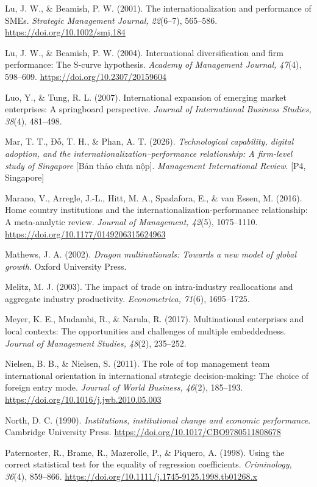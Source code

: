 \documentclass[
  a4paper,
  13pt]{extreport}
\begin{document}
Lu, J. W., \& Beamish, P. W. (2001). The internationalization and
performance of SMEs. \emph{Strategic Management Journal, 22}(6--7),
565--586. \url{https://doi.org/10.1002/smj.184}

Lu, J. W., \& Beamish, P. W. (2004). International diversification and
firm performance: The S-curve hypothesis. \emph{Academy of Management
Journal, 47}(4), 598--609. \url{https://doi.org/10.2307/20159604}

Luo, Y., \& Tung, R. L. (2007). International expansion of emerging
market enterprises: A springboard perspective. \emph{Journal of
International Business Studies, 38}(4), 481--498.

Mar, T. T., Đỗ, T. H., \& Phan, A. T. (2026). \emph{Technological
capability, digital adoption, and the internationalization--performance
relationship: A firm-level study of Singapore} {[}Bản thảo chưa nộp{]}.
\emph{Management International Review}. {[}P4, Singapore{]}

Marano, V., Arregle, J.-L., Hitt, M. A., Spadafora, E., \& van Essen, M.
(2016). Home country institutions and the
internationalization-performance relationship: A meta-analytic review.
\emph{Journal of Management, 42}(5), 1075--1110.
\url{https://doi.org/10.1177/0149206315624963}

Mathews, J. A. (2002). \emph{Dragon multinationals: Towards a new model
of global growth}. Oxford University Press.

Melitz, M. J. (2003). The impact of trade on intra-industry
reallocations and aggregate industry productivity. \emph{Econometrica,
71}(6), 1695--1725.

Meyer, K. E., Mudambi, R., \& Narula, R. (2017). Multinational
enterprises and local contexts: The opportunities and challenges of
multiple embeddedness. \emph{Journal of Management Studies, 48}(2),
235--252.

Nielsen, B. B., \& Nielsen, S. (2011). The role of top management team
international orientation in international strategic decision-making:
The choice of foreign entry mode. \emph{Journal of World Business,
46}(2), 185--193. \url{https://doi.org/10.1016/j.jwb.2010.05.003}

North, D. C. (1990). \emph{Institutions, institutional change and
economic performance}. Cambridge University Press.
\url{https://doi.org/10.1017/CBO9780511808678}

Paternoster, R., Brame, R., Mazerolle, P., \& Piquero, A. (1998). Using
the correct statistical test for the equality of regression
coefficients. \emph{Criminology, 36}(4), 859--866.
\url{https://doi.org/10.1111/j.1745-9125.1998.tb01268.x}
\end{document}
